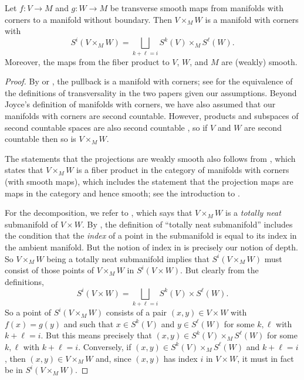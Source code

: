 \begin{theorem}\label{pullback}
	Let $f \colon V \to M$ and $g \colon W \to M$ be transverse smooth maps from manifolds with corners to a manifold without boundary.
	Then $V \times_M W$ is a manifold with corners with
	\begin{equation*}
		S^i(V \times_M W) = \bigsqcup_{k + \ell = i} S^k(V) \times_M S^\ell(W).
	\end{equation*}
	Moreover, the maps from the fiber product to $V$, $W$, and $M$ are (weakly) smooth.
\end{theorem}
\begin{proof}
By  \cite[Theorem 6.4]{Joy12} or \cite[Theorem 7.2.7]{MaDo92}, the pullback is a manifold with corners; see \cite[Remark 6.3]{Joy12} for the equivalence of the definitions of transversality in the two papers given our assumptions.
Beyond Joyce's definition of manifolds with corners, we have also assumed that our manifolds with corners are second countable.
However, products and subspaces of second countable spaces are also second countable \cite[Theorem 30.2]{Mu00}, so if $V$ and $W$ are second countable then so is $V \times_M W$. 

The statements that the projections are weakly smooth also follows from \cite[Theorem 6.4]{Joy12}, which states that $V\times_MW$ is a fiber product in the category of manifolds with corners (with smooth maps), which includes the statement that the projection maps are maps in the category and hence smooth; see the introduction to \cite[Section 6]{Joy12}.

For the decomposition, we refer to \cite[Theorem 7.2.7.a]{MaDo92}, which says that $V\times_MW$ is a \textit{totally neat} submanifold of $V\times W$.
By \cite[Definition 3.1.10]{MaDo92}, the definition of ``totally neat submanifold'' includes the condition that the \textit{index} of a point in the submanifold is equal to its index in the ambient manifold.
But the notion of index in \cite{MaDo92} is precisely our notion of depth. So $V\times_MW$ being a totally neat submanifold implies that $S^i(V\times_MW)$ must consist of those points of $V\times_MW$ in $S^i(V\times W)$.
But clearly from the definitions,
$$S^i(V\times W)=\bigsqcup_{k + \ell = i} S^k(V) \times S^\ell(W).$$
So a point of $S^i(V\times_M W)$ consists of a pair $(x,y)\in V\times W$ with $f(x)=g(y)$ and such that $x\in S^k(V)$ and $y\in S^\ell(W)$ for some $k,\ell$ with $k+\ell=i$.
But this means precisely that $(x,y)\in S^k(V) \times_M S^\ell(W)$ for some $k,\ell$ with $k+\ell=i$.
Conversely, if $(x,y)\in S^k(V) \times_M S^\ell(W)$ and $k+\ell=i$, then $(x,y)\in V\times_MW$ and, since $(x,y)$ has index $i$ in $V\times W$, it must in fact be in $S^i(V\times_M W)$.
\end{proof}


